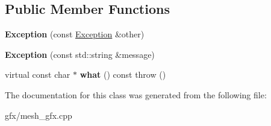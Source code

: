 \subsection*{Public Member Functions}
\begin{DoxyCompactItemize}
\item 
{\bfseries Exception} (const \hyperlink{classException}{Exception} \&other)\hypertarget{classException_ae0fd52e62283ee92c085d767d0aab736}{}\label{classException_ae0fd52e62283ee92c085d767d0aab736}

\item 
{\bfseries Exception} (const std\+::string \&message)\hypertarget{classException_a472b7904dadf1047ba48c23741888456}{}\label{classException_a472b7904dadf1047ba48c23741888456}

\item 
virtual const char $\ast$ {\bfseries what} () const   throw ()\hypertarget{classException_a78154a31544a609cbd226d32574f52cd}{}\label{classException_a78154a31544a609cbd226d32574f52cd}

\end{DoxyCompactItemize}


The documentation for this class was generated from the following file\+:\begin{DoxyCompactItemize}
\item 
gfx/mesh\+\_\+gfx.\+cpp\end{DoxyCompactItemize}

